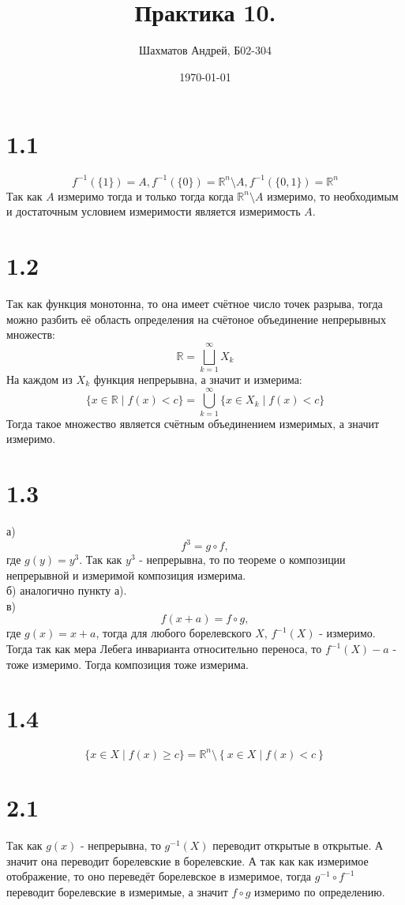 \documentclass[12pt]{article}
\title{Практика 10.}
\author{Шахматов Андрей, Б02-304}
\date{\today}
\begin{document}
\maketitle
\tableofcontents

\section{1.1}
\[
    f^{-1} (\{1\}) = A, f^{-1}(\{0\}) = \mathbb{R}^n \setminus A, f^{-1}(\{0, 1\}) = \mathbb{R}^n 
\]
Так как $A$ измеримо тогда и только тогда когда $\mathbb{R}^n \setminus A$ измеримо, то 
необходимым и достаточным условием измеримости является измеримость $A$. 
\section{1.2}
Так как функция монотонна, то она имеет счётное число точек разрыва, тогда можно разбить 
её область определения на счётоное объединение непрерывных множеств: 
\[
    \mathbb{R} = \bigsqcup_{k = 1}^{\infty} X_k
\]   
На каждом из $X_k$ функция непрерывна, а значит и измерима: 
\[
    \{x \in \mathbb{R} \mid f(x) < c\} = \bigcup_{k=1}^{\infty} \{{x \in X_k \mid f(x) < c}\}
\] 
Тогда такое множество является счётным объединением измеримых, а значит измеримо.
\section{1.3}
а) 
\[
    f^3 = g \circ f, 
\] 
где $g(y) = y^3$. Так как $y^3$ - непрерывна, то по теореме о композиции непрерывной и измеримой 
композиция измерима. 
\\ б)
аналогично пункту а). 
\\ в) 
\[
    f(x + a) = f \circ g, 
\]
где $g(x) = x + a$, тогда для любого борелевского $X$, $f^{-1}(X)$ - измеримо. Тогда так как 
мера Лебега инварианта относительно переноса, то $f^{-1}(X) - a$ - тоже измеримо.  Тогда композиция тоже 
измерима.     
\section{1.4}
\[
    \{x \in X \mid f(x) \geq c \} = \mathbb{R}^n \setminus \left\{ x \in X \mid f(x) < c \right\}  
\]
\section{2.1}
Так как $g(x)$ - непрерывна, то $g^{-1}(X)$ переводит открытые в открытые. А значит она переводит 
борелевские в борелевские. А так как как измеримое отображение, то оно переведёт 
борелевское в измеримое, тогда $g^{-1} \circ f^{-1}$ переводит борелевские в измеримые, а значит 
$f \circ g$ измеримо по определению. 
\end{document}
